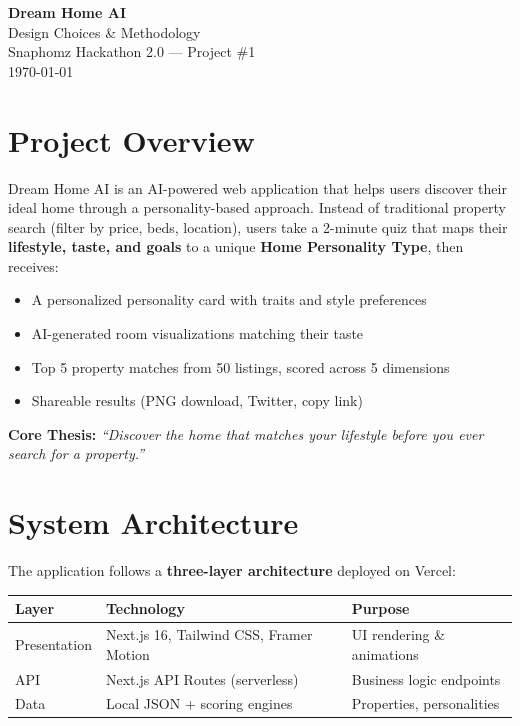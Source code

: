 \documentclass[11pt,a4paper]{article}
\begin{document}
\begin{center}
    {\LARGE\textbf{Dream Home AI}}\\[6pt]
    {\large Design Choices \& Methodology}\\[12pt]
    {\normalsize Snaphomz Hackathon 2.0 --- Project \#1}\\[4pt]
    {\small \today}
\end{center}

\vspace{8pt}

\section{Project Overview}

Dream Home AI is an AI-powered web application that helps users discover their ideal home through a personality-based approach. Instead of traditional property search (filter by price, beds, location), users take a 2-minute quiz that maps their \textbf{lifestyle, taste, and goals} to a unique \textbf{Home Personality Type}, then receives:

\begin{itemize}[nosep]
    \item A personalized personality card with traits and style preferences
    \item AI-generated room visualizations matching their taste
    \item Top 5 property matches from 50 listings, scored across 5 dimensions
    \item Shareable results (PNG download, Twitter, copy link)
\end{itemize}

\noindent\textbf{Core Thesis:} \textit{``Discover the home that matches your lifestyle before you ever search for a property.''}

\section{System Architecture}

The application follows a \textbf{three-layer architecture} deployed on Vercel:

\begin{table}[h]
\centering
\begin{tabular}{@{}lll@{}}
\toprule
\textbf{Layer} & \textbf{Technology} & \textbf{Purpose} \\
\midrule
Presentation & Next.js 16, Tailwind CSS, Framer Motion & UI rendering \& animations \\
API & Next.js API Routes (serverless) & Business logic endpoints \\
Data & Local JSON + scoring engines & Properties, personalities \\
\bottomrule
\end{tabular}
\end{table}
\end{document}
